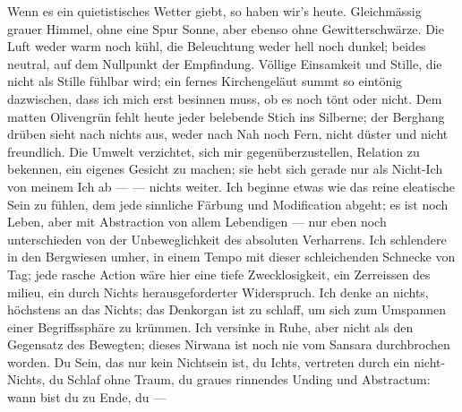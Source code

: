 Wenn es ein quietistisches Wetter giebt, so haben wir’s heute. Gleichmässig grauer Himmel, ohne eine Spur Sonne, aber ebenso ohne Gewitterschwärze. Die Luft weder warm noch kühl, die Beleuchtung weder hell noch dunkel; beides neutral, auf dem Nullpunkt der Empfindung. Völlige Einsamkeit und Stille, die nicht als Stille fühlbar wird; ein fernes Kirchengeläut summt so eintönig dazwischen, dass ich mich erst besinnen muss, ob es noch tönt oder nicht. Dem matten Olivengrün fehlt heute jeder belebende Stich ins Silberne; der Berghang drüben sieht nach nichts aus, weder nach Nah noch Fern, nicht düster und nicht freundlich. Die Umwelt verzichtet, sich mir gegenüberzustellen, Relation zu bekennen, ein eigenes Gesicht zu machen; sie hebt sich gerade nur als Nicht-Ich von meinem Ich ab — — nichts weiter. Ich beginne etwas wie das reine eleatische Sein zu fühlen, dem jede sinnliche Färbung und Modification abgeht; es ist noch Leben, aber mit Abstraction von allem Lebendigen — nur eben noch unterschieden von der Unbeweglichkeit des absoluten Verharrens. Ich schlendere in den Bergwiesen umher, in einem Tempo mit dieser schleichenden Schnecke von Tag; jede rasche Action wäre hier eine tiefe Zwecklosigkeit, ein Zerreissen des milieu, ein durch Nichts herausgeforderter Widerspruch. Ich denke an nichts, höchstens an das Nichts; das Denkorgan ist zu schlaff, um sich zum Umspannen einer Begriffssphäre zu krümmen. Ich versinke in Ruhe, aber nicht als den Gegensatz des Bewegten; dieses Nirwana ist noch nie vom Sansara durchbrochen worden. Du Sein, das nur kein Nichtsein ist, du Ichts, vertreten durch ein nicht-Nichts, du Schlaf ohne Traum, du graues rinnendes Unding und Abstractum: wann bist du zu Ende, du — 
\par

